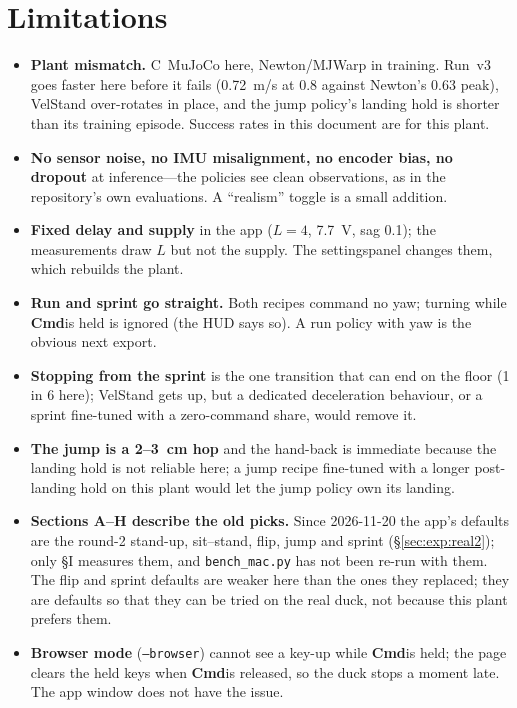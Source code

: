 \documentclass[11pt]{article}
\newcommand{\code}[1]{\texttt{\small #1}}
\newcommand{\cmdkey}{\textsf{\textbf{Cmd}}}      %
\newcommand{\gear}{\textsf{settings}}
\begin{document}
\section{Limitations}\label{sec:lim}
\begin{itemize}[nosep]
\item \textbf{Plant mismatch.} C~MuJoCo here, Newton/MJWarp in training. Run~v3 goes faster here before it fails
  (0.72~m/s at 0.8 against Newton's 0.63 peak), VelStand over-rotates in place, and the jump policy's landing hold
  is shorter than its training episode. Success rates in this document are for this plant.
\item \textbf{No sensor noise, no IMU misalignment, no encoder bias, no dropout} at inference---the policies see
  clean observations, as in the repository's own evaluations. A ``realism'' toggle is a small addition.
\item \textbf{Fixed delay and supply} in the app ($L=4$, 7.7~V, sag 0.1); the measurements draw $L$ but not the
  supply. The \gear panel changes them, which rebuilds the plant.
\item \textbf{Run and sprint go straight.} Both recipes command no yaw; turning while \cmdkey is held is ignored
  (the HUD says so). A run policy with yaw is the obvious next export.
\item \textbf{Stopping from the sprint} is the one transition that can end on the floor (1 in 6 here); VelStand
  gets up, but a dedicated deceleration behaviour, or a sprint fine-tuned with a zero-command share, would remove it.
\item \textbf{The jump is a 2--3~cm hop} and the hand-back is immediate because the landing hold is not reliable
  here; a jump recipe fine-tuned with a longer post-landing hold on this plant would let the jump policy own its
  landing.
\item \textbf{Sections A--H describe the old picks.} Since 2026-11-20 the app's defaults are the round-2
  stand-up, sit--stand, flip, jump and sprint (\S\ref{sec:exp:real2}); only \S I measures them, and \code{bench\_mac.py}
  has not been re-run with them. The flip and sprint defaults are weaker here than the ones they replaced; they
  are defaults so that they can be tried on the real duck, not because this plant prefers them.
\item \textbf{Browser mode} (\code{--browser}) cannot see a key-up while \cmdkey is held; the page clears the
  held keys when \cmdkey is released, so the duck stops a moment late. The app window does not have the issue.
\end{itemize}
\end{document}
